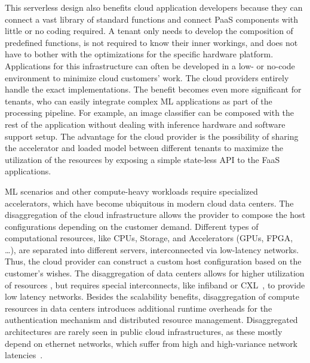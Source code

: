 This serverless design also benefits cloud application developers because they can connect a vast library of standard functions and connect \ac{PaaS} components with little or no coding required.
A tenant only needs to develop the composition of predefined functions, is not required to know their inner workings, and does not have to bother with the optimizations for the specific hardware platform. Applications for this infrastructure can often be developed in a low- or no-code environment to minimize cloud customers' work. The cloud providers entirely handle the exact implementations. The benefit becomes even more significant for tenants, who can easily integrate complex \ac{ML} applications as part of the processing pipeline. For example, an image classifier can be composed with the rest of the application without dealing with inference hardware and software support setup. The advantage for the cloud provider is the possibility of sharing the accelerator and loaded model between different tenants to maximize the utilization of the resources by exposing a simple state-less \ac{API} to the \ac{FaaS} applications.

\ac{ML} scenarios and other compute-heavy workloads require specialized accelerators, which have become ubiquitous in modern cloud data centers. The disaggregation of the cloud infrastructure allows the provider to compose the host configurations depending on the customer demand. Different types of computational resources, like CPUs, Storage, and Accelerators (\acp{GPU}, \ac{FPGA}, \ldots), are separated into different servers, interconnected via low-latency networks. Thus, the cloud provider can construct a custom host configuration based on the customer's wishes. The disaggregation of data centers allows for higher utilization of resources \cite{duatoRCUDAReducingNumber2010, intelIntelRackScale2014, linDisaggregatedDataCenters2020a}, but requires special interconnects, like infiband or \ac{CXL}~\cite{HomepageComputeExpress2023}, to provide low latency networks. Besides the scalability benefits, disaggregation of compute resources in data centers introduces additional runtime overheads for the authentication mechanism and distributed resource management. Disaggregated architectures are rarely seen in public cloud infrastructures, as these mostly depend on ethernet networks, which suffer from high and high-variance network latencies~\cite{popescuMeasuringNetworkConditions2021}.\@

